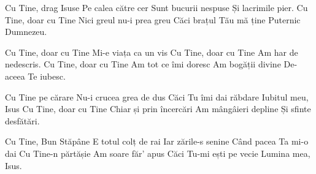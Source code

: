 

\beginverse
Cu Tine, drag Isuse
Pe calea către cer
Sunt bucurii nespuse
Și lacrimile pier.
Cu Tine, doar cu Tine
Nici greul nu-i prea greu
Căci brațul Tău mă ține
Puternic Dumnezeu.
\endverse

\beginchorus
Cu Tine, doar cu Tine
Mi-e viața ca un vis
Cu Tine, doar cu Tine
Am har de nedescris.
Cu Tine, doar cu Tine
Am tot ce îmi doresc
Am bogății divine
De-aceea Te iubesc.
\endchorus

\beginverse
Cu Tine pe cărare
Nu-i crucea grea de dus
Căci Tu îmi dai răbdare
Iubitul meu, Isus
Cu Tine, doar cu Tine
Chiar și prin încercări
Am mângâieri depline
Și sfinte desfătări.
\endverse

\beginverse
Cu Tine, Bun Stăpâne
E totul colț de rai
Iar zările-s senine
Când pacea Ta mi-o dai
Cu Tine-n părtășie
Am soare făr' apus
Căci Tu-mi ești pe vecie
Lumina mea, Isus.
\endverse

\endsong
